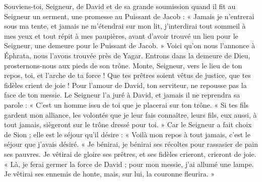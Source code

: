 Souviens-toi, Seigneur, de David et de sa grande soumission
\versseparator
quand il fit au Seigneur un serment, une promesse au Puissant de Jacob :
\versseparator
« Jamais je n'entrerai sous ma tente, et jamais ne m'étendrai sur mon lit,
\versseparator
j'interdirai tout sommeil à mes yeux et tout répit à mes paupières,
\versseparator
avant d'avoir trouvé un lieu pour le Seigneur, une demeure pour le Puissant de Jacob. »
\versseparator
Voici qu'on nous l'annonce à Éphrata, nous l'avons trouvée près de Yagar.
\versseparator
Entrons dans la demeure de Dieu, prosternons-nous aux pieds de son trône.
\versseparator
Monte, Seigneur, vers le lieu de ton repos, toi, et l'arche de ta force !
\versseparator
Que tes prêtres soient vêtus de justice, que tes fidèles crient de joie !
\versseparator
Pour l'amour de David, ton serviteur, ne repousse pas la face de ton messie.
\versseparator
Le Seigneur l'a juré à David, et jamais il ne reprendra sa parole : « C'est un homme issu de toi que je placerai sur ton trône.
\versseparator
« Si tes fils gardent mon alliance, les volontés que je leur fais connaître, leurs fils, eux aussi, à tout jamais, siègeront sur le trône dressé pour toi. »
\versseparator
Car le Seigneur a fait choix de Sion ; elle est le séjour qu'il désire :
\versseparator
« Voilà mon repos à tout jamais, c'est le séjour que j'avais désiré.
\versseparator
« Je bénirai, je bénirai ses récoltes pour rassasier de pain ses pauvres.
\versseparator
Je vêtirai de gloire ses prêtres, et ses fidèles crieront, crieront de joie.
\versseparator
« Là, je ferai germer la force de David ; pour mon messie, j'ai allumé une lampe.
\versseparator
Je vêtirai ses ennemis de honte, mais, sur lui, la couronne fleurira. »
